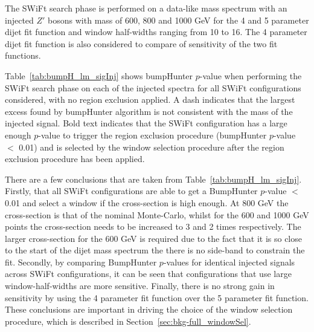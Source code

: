 The  SWiFt search phase is performed on a data-like mass spectrum
with an injected $Z'$ bosons with mass of 600, 800 and 1000 GeV
for the 4 and 5 parameter dijet fit function and window half-widths ranging from 10 to 16.
The 4 parameter dijet fit function is also considered to compare of sensitivity of the two fit functions.

Table~\ref{tab:bumpH_lm_sigInj} shows bumpHunter \mbox{$p$-value} 
when performing the SWiFt search phase on each of the injected spectra
for all SWiFt configurations considered, with no region exclusion applied.
A dash indicates that the largest excess found by bumpHunter algorithm is not consistent with the mass of the injected signal.
Bold text indicates that the SWiFt configuration has a large enough $p$-value
to trigger the region exclusion procedure (bumpHunter $p$-value $<$ 0.01)
and is selected by the window selection procedure after the region exclusion procedure has been applied.

There are a few conclusions that are taken from Table~\ref{tab:bumpH_lm_sigInj}.
Firstly, that all SWiFt configurations are able to get a {\sc BumpHunter} $p$-value $<$ 0.01 and select a window if the cross-section is high enough.
At 800 GeV the cross-section is that of the nominal Monte-Carlo, whilst for the 600 and 1000 GeV points
the cross-section needs to be increased to 3 and 2 times respectively.
The larger cross-section for the 600 GeV is required due to the fact that it is so close to the start of the dijet mass spectrum
the there is no side-band to constrain the fit.
Secondly, by comparing {\sc BumpHunter} $p$-values for identical injected signals across SWiFt configurations,
it can be seen that configurations that use large window-half-widths are more sensitive.
Finally, there is no strong gain in sensitivity by using the 4 parameter fit function over the 5 parameter fit function.
These conclusions are important in driving the choice of the window selection procedure, which is described in Section~\ref{sec:bkg-full_windowSel}.

